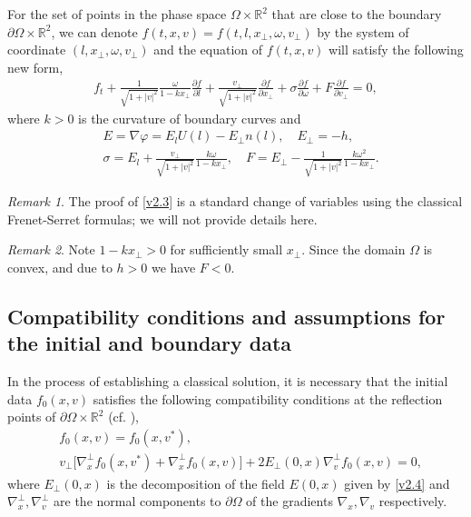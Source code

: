 \documentclass[11pt,reqno]{amsart}%
\theoremstyle{definition}
\theoremstyle{remark}
\newtheorem{Remark}{Remark}[section]
\begin{document}
For the set of points  in the phase space $\Omega\times \mathbb{R}^{2}$ that are
close to the boundary $\partial\Omega\times \mathbb{R}^{2}$, we can denote $f(t,x,v)=f(t,l,x_{\bot},\omega,v_{\bot})$ by the system of coordinate $(l,x_{\bot},\omega,v_{\bot})$
and the equation of $f(t,x,v)$ will satisfy the following new form,
\begin{align}
f_{t}+\frac{1}{\sqrt{1+|v|^{2}}}\frac{\omega}{1-kx_{\bot}}\frac{\partial f}{\partial l}+\frac{v_{\bot}}{\sqrt{1+|v|^{2}}}\frac{\partial f}{\partial x_{\bot}}
+\sigma \frac{\partial f}{\partial \omega}+F\frac{\partial f}{\partial v_{\bot}}=0,\label{v2.3}
\end{align}
where $k>0$ is the curvature of boundary curves and
\begin{align}
&E=\nabla \varphi=E_{l}U(l)-E_{\bot}n(l), \quad E_{\bot}=-h, \label{v2.4}\\
&\sigma=E_{l}+\frac{v_{\bot}}{\sqrt{1+|v|^{2}}}\frac{k\omega}{1-kx_{\bot}},\quad F=E_{\bot}-\frac{1}{\sqrt{1+|v|^{2}}}\frac{k\omega^{2}}{1-kx_{\bot}}.\label{v2.5}
\end{align}
\begin{Remark}
The proof of \eqref{v2.3} is a standard change of variables  using the classical Frenet-Serret formulas; we will not provide details here.
\end{Remark}
\begin{Remark}
Note $1-kx_{\bot}>0$ for sufficiently small $x_{\bot}$. Since the domain $\Omega $ is convex, and due to $h>0$ we have
$F < 0$.
\end{Remark}

\subsection{Compatibility conditions and assumptions for the initial and boundary data}

In the process of establishing a classical solution, it is necessary that the initial data $f_{0}(x,v)$ satisfies the following compatibility conditions  at the reflection points of
$\partial\Omega\times \mathbb{R}^{2}$ (cf.  \cite{G2,H1}),
\begin{align}
&f_{0}(x,v)=f_{0}(x,v^{*}),\label{v2.6}\\
&v_{\bot}\Big[\nabla_{x}^{\bot}f_{0}(x,v^{*})+\nabla_{x}^{\bot}f_{0}(x,v)\Big]+2E_{\bot}(0,x)\nabla_{v}^{\bot}f_{0}(x,v)=0,\label{v2.7}
\end{align}
where $E_{\bot}(0, x)$ is the decomposition of the field $E (0, x)$ given by \eqref{v2.4} and
$\nabla_{x}^{\bot},\nabla_{v}^{\bot}$ are the normal components to $\partial\Omega$ of the gradients $\nabla_x,\nabla_v$ respectively.
\end{document}

